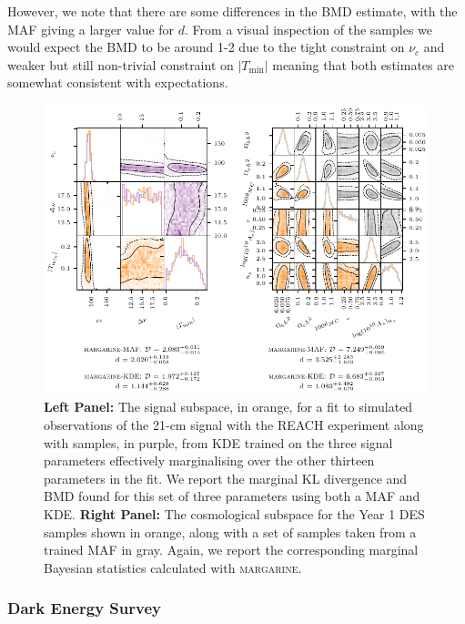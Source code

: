 However, we note that there are some differences in the BMD estimate, with the MAF giving a larger value for $d$. From a visual inspection of the samples we would expect the BMD to be around 1-2 due to the tight constraint on $\nu_c$ and weaker but still non-trivial constraint on $|T_\mathrm{min}|$ meaning that both estimates are somewhat consistent with expectations.

\begin{figure}
    \centering
    \includegraphics[width=\linewidth]{margarine/figs/cosmo_examples_alt.pdf}
    \caption{\textbf{Left Panel:} The signal subspace, in orange, for a fit to simulated observations of the 21-cm signal with the REACH experiment along with samples, in purple, from KDE trained on the three signal parameters effectively marginalising over the other thirteen parameters in the fit. We report the marginal KL divergence and BMD found for this set of three parameters using both a MAF and KDE. \textbf{Right Panel:} The cosmological subspace for the Year 1 DES samples shown in orange, along with a set of samples taken from a trained MAF in gray. Again, we report the corresponding marginal Bayesian statistics calculated with \textsc{margarine}.}
    \label{fig:cosmo_examples}
\end{figure}

\subsubsection{Dark Energy Survey}


